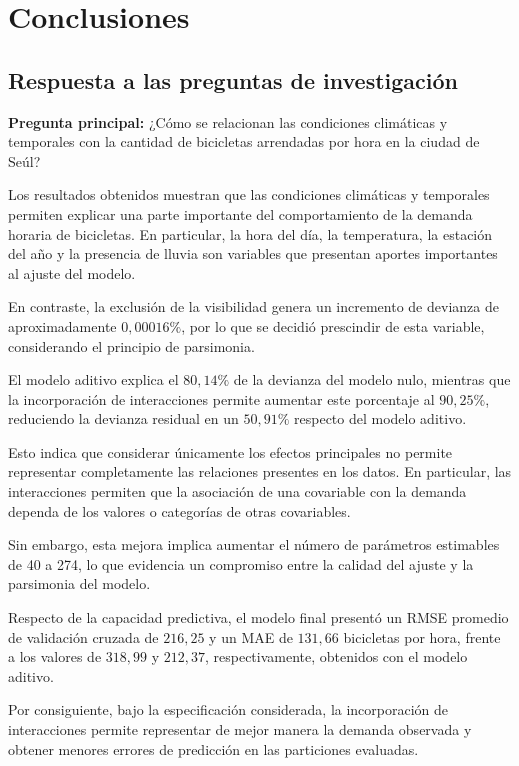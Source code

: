 \documentclass[12pt, a4paper]{article}
\numberwithin{equation}{section}
\begin{document}
\section{Conclusiones}

\subsection{Respuesta a las preguntas de investigación}

\textbf{Pregunta principal:}
¿Cómo se relacionan las condiciones climáticas y temporales
con la cantidad de bicicletas arrendadas por hora en la
ciudad de Seúl?

Los resultados obtenidos muestran que las condiciones
climáticas y temporales permiten explicar una parte
importante del comportamiento de la demanda horaria de
bicicletas. En particular, la hora del día, la temperatura,
la estación del año y la presencia de lluvia son variables
que presentan aportes importantes al ajuste del modelo.

En contraste, la exclusión de la visibilidad genera un
incremento de devianza de aproximadamente $0{,}00016\%$,
por lo que se decidió prescindir de esta variable,
considerando el principio de parsimonia.

El modelo aditivo explica el $80{,}14\%$ de la devianza
del modelo nulo, mientras que la incorporación de
interacciones permite aumentar este porcentaje al
$90{,}25\%$, reduciendo la devianza residual en un
$50{,}91\%$ respecto del modelo aditivo.

Esto indica que considerar únicamente los efectos
principales no permite representar completamente las
relaciones presentes en los datos. En particular,
las interacciones permiten que la asociación de una
covariable con la demanda dependa de los valores
o categorías de otras covariables.

Sin embargo, esta mejora implica aumentar el número
de parámetros estimables de 40 a 274, lo que evidencia
un compromiso entre la calidad del ajuste y la
parsimonia del modelo.

Respecto de la capacidad predictiva, el modelo final
presentó un RMSE promedio de validación cruzada de
$216{,}25$ y un MAE de $131{,}66$ bicicletas por hora,
frente a los valores de $318{,}99$ y $212{,}37$,
respectivamente, obtenidos con el modelo aditivo.

Por consiguiente, bajo la especificación considerada,
la incorporación de interacciones permite representar
de mejor manera la demanda observada y obtener menores
errores de predicción en las particiones evaluadas.
\end{document}

